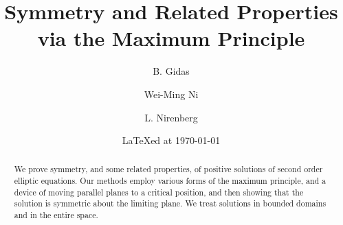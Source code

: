 \documentclass{article}
\begin{document}
\title{Symmetry and Related Properties via the Maximum Principle}
\author{B. Gidas \and Wei-Ming Ni \and L. Nirenberg}
\date{\LaTeX ed at \today}
\maketitle

\begin{abstract}
  We prove symmetry, and some related properties, of positive solutions of second order elliptic 
  equations. Our methods employ various forms of the maximum principle, and a device of moving 
  parallel planes to a critical position, and then showing that the solution is symmetric about 
  the limiting plane. We treat solutions in bounded domains and in the entire space.
\end{abstract}







\nocite{*}

\end{document}
